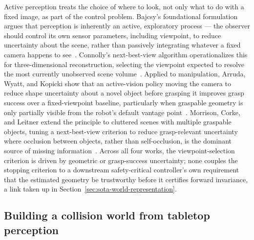 \documentclass[12pt,a4paper,twoside,openright]{report}
\begin{document}
Active perception treats the choice of where to look, not only what to do with a fixed image, as part of the control problem. Bajcsy's foundational formulation argues that perception is inherently an active, exploratory process --- the observer should control its own sensor parameters, including viewpoint, to reduce uncertainty about the scene, rather than passively integrating whatever a fixed camera happens to see~\cite{bajcsy1988activeperception}. Connolly's next-best-view algorithm operationalizes this for three-dimensional reconstruction, selecting the viewpoint expected to resolve the most currently unobserved scene volume~\cite{connolly1985nextbestview}. Applied to manipulation, Arruda, Wyatt, and Kopicki show that an active-vision policy moving the camera to reduce shape uncertainty about a novel object before grasping it improves grasp success over a fixed-viewpoint baseline, particularly when graspable geometry is only partially visible from the robot's default vantage point~\cite{arruda2016activevision}. Morrison, Corke, and Leitner extend the principle to cluttered scenes with multiple graspable objects, tuning a next-best-view criterion to reduce grasp-relevant uncertainty where occlusion between objects, rather than self-occlusion, is the dominant source of missing information~\cite{morrison2019multiview}. Across all four works, the viewpoint-selection criterion is driven by geometric or grasp-success uncertainty; none couples the stopping criterion to a downstream safety-critical controller's own requirement that the estimated geometry be trustworthy before it certifies forward invariance, a link taken up in Section~\ref{sec:sota-world-representation}.

\subsection{Building a collision world from tabletop perception}
\label{sec:sota-tabletop-world}
\end{document}
